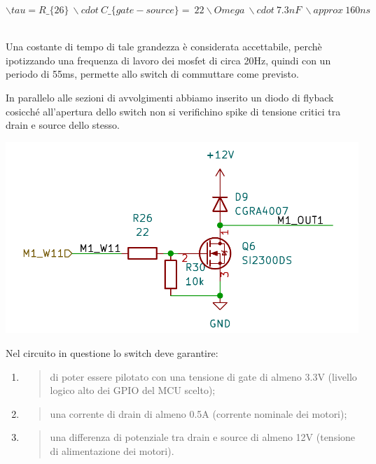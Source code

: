 \(\backslash tau = R\_\{ 26\}\ \backslash cdot\ C\_\{ gate - source\} = \ 22\backslash Omega\ \backslash cdot\ 7.3nF\ \backslash approx\ 160ns\)\(\)

Una costante di tempo di tale grandezza è considerata accettabile,
perchè ipotizzando una frequenza di lavoro dei mosfet di circa 20Hz,
quindi con un periodo di 55ms, permette allo switch di commuttare come
previsto.

In parallelo alle sezioni di avvolgimenti abbiamo inserito un diodo di
flyback cosicché all'apertura dello switch non si verifichino spike di
tensione critici tra drain e source dello stesso.

\begin{center}
\includegraphics[scale=0.5]{figures/image63.png}
\captionsetup{type=figure}
\end{center}

Nel circuito in questione lo switch deve garantire:

\begin{enumerate}
\def\labelenumi{\arabic{enumi}.}
\item
  \begin{quote}
  di poter essere pilotato con una tensione di gate di almeno 3.3V
  (livello logico alto dei GPIO del MCU scelto);
  \end{quote}
\item
  \begin{quote}
  una corrente di drain di almeno 0.5A (corrente nominale dei motori);
  \end{quote}
\item
  \begin{quote}
  una differenza di potenziale tra drain e source di almeno 12V
  (tensione di alimentazione dei motori).
  \end{quote}
\end{enumerate}

